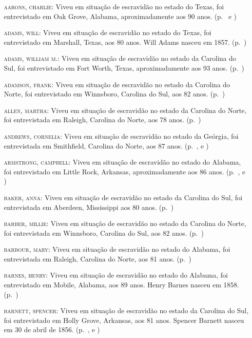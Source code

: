 \begin{Parskip}
\textsc{aarons, charlie:} Viveu em situação de escravidão no estado do Texas, foi entrevistado
em Oak Grove, Alabama, aproximadamente aos 90 anos. (p.~\pageref{ref01} e \pageref{ref02})

\textsc{adams, will:} Viveu em situação de escravidão no estado do Texas, foi entrevistado em
Marshall, Texas, aos 80 anos. Will Adams nasceu em 1857. (p.~\pageref{ref03})

\textsc{adams, william m.:} Viveu em situação de escravidão no estado da Carolina do Sul, foi
entrevistado em Fort Worth, Texas, aproximadamente aos 93 anos. (p.~\pageref{ref04})

\textsc{adamson, frank:} Viveu em situação de escravidão no estado da Carolina do Norte, foi
entrevistado em Winnsboro, Carolina do Sul, aos 82 anos. (p.~\pageref{ref05})

\textsc{allen, martha:} Viveu em situação de escravidão no estado da Carolina do Norte, foi
entrevistada em Raleigh, Carolina do Norte, aos 78 anos. (p.~\pageref{ref06})

\textsc{andrews, cornelia:} Viveu em situação de escravidão no estado da Geórgia, foi
entrevistada em Smithfield, Carolina do Norte, aos 87 anos. (p.~\pageref{ref07}, \pageref{ref08} e \pageref{ref09})

\textsc{armstrong, campbell:} Viveu em situação de escravidão no estado do Alabama, foi
entrevistado em Little Rock, Arkansas, aproximadamente aos 86 anos. (p.~\pageref{ref10}, \pageref{ref11} e \pageref{ref12})

\textsc{baker, anna:} Viveu em situação de escravidão no estado da Carolina do Sul, foi
entrevistada em Aberdeen, Mississippi aos 80 anos. (p.~\pageref{ref13})

\textsc{barber, millie:} Viveu em situação de escravidão no estado da Carolina do Norte, foi
entrevistada em Winnsboro, Carolina do Sul, aos 82 anos. (p.~\pageref{ref14})

\textsc{barbour, mary:} Viveu em situação de escravidão no estado do Alabama, foi entrevistada
em Raleigh, Carolina do Norte, aos 81 anos. (p.~\pageref{ref15})

\textsc{barnes, henry:} Viveu em situação de escravidão no estado do Alabama, foi entrevistado
em Mobile, Alabama, aos 89 anos. Henry Barnes nasceu em 1858. (p.~\pageref{ref16})

\textsc{barnett, spencer:} Viveu em situação de escravidão no estado da Carolina do Sul, foi
entrevistado em Holly Grove, Arkansas, aos 81 anos. Spencer Barnett
nasceu em 30 de abril de 1856. (p.~\pageref{ref17}, \pageref{ref18} e \pageref{ref19})


\end{Parskip}
